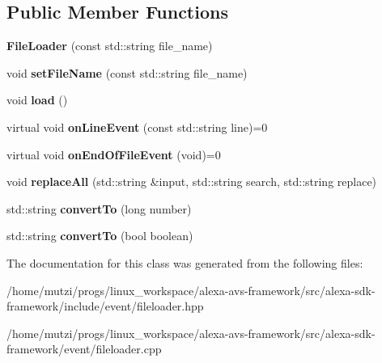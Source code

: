 \subsection*{Public Member Functions}
\begin{DoxyCompactItemize}
\item 
\mbox{\label{classAlexaEvent_1_1FileLoader_acf79b58743d2cbe7ff9cfb7dbd9d0f41}} 
{\bfseries File\+Loader} (const std\+::string file\+\_\+name)
\item 
\mbox{\label{classAlexaEvent_1_1FileLoader_aad27b1e65065793fe7329c7a4748c1ec}} 
void {\bfseries set\+File\+Name} (const std\+::string file\+\_\+name)
\item 
\mbox{\label{classAlexaEvent_1_1FileLoader_aea473d22b9d3da6c60bd4da463cb29b6}} 
void {\bfseries load} ()
\item 
\mbox{\label{classAlexaEvent_1_1FileLoader_a93c51beb9ecda097e09979f830407fe4}} 
virtual void {\bfseries on\+Line\+Event} (const std\+::string line)=0
\item 
\mbox{\label{classAlexaEvent_1_1FileLoader_ac1ac6624be3f2592631af1ba32ed0101}} 
virtual void {\bfseries on\+End\+Of\+File\+Event} (void)=0
\item 
\mbox{\label{classAlexaEvent_1_1FileLoader_a7843d56d0d1c5238b886180a154c43e9}} 
void {\bfseries replace\+All} (std\+::string \&input, std\+::string search, std\+::string replace)
\item 
\mbox{\label{classAlexaEvent_1_1FileLoader_a587614f144fa4791a61a769a28644aca}} 
std\+::string {\bfseries convert\+To} (long number)
\item 
\mbox{\label{classAlexaEvent_1_1FileLoader_a9f8050d7d81f4974c1e7e14c0a082b25}} 
std\+::string {\bfseries convert\+To} (bool boolean)
\end{DoxyCompactItemize}


The documentation for this class was generated from the following files\+:\begin{DoxyCompactItemize}
\item 
/home/mutzi/progs/linux\+\_\+workspace/alexa-\/avs-\/framework/src/alexa-\/sdk-\/framework/include/event/fileloader.\+hpp\item 
/home/mutzi/progs/linux\+\_\+workspace/alexa-\/avs-\/framework/src/alexa-\/sdk-\/framework/event/fileloader.\+cpp\end{DoxyCompactItemize}
